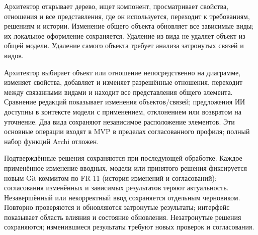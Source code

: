 \documentclass[10pt,a4paper]{article}
\begin{document}
Архитектор открывает дерево, ищет компонент, просматривает свойства, отношения и все представления, где он используется, переходит к требованиям, решениям и истории. Изменение общего объекта обновляет все зависимые виды; их локальное оформление сохраняется. Удаление из вида не удаляет объект из общей модели. Удаление самого объекта требует анализа затронутых связей и видов.

Архитектор выбирает объект или отношение непосредственно на диаграмме, изменяет свойства, добавляет и изменяет разрешённые отношения, переходит между связанными видами и находит все представления общего элемента. Сравнение редакций показывает изменения объектов/связей; предложения ИИ доступны в контексте модели с применением, отклонением или возвратом на уточнение. Два вида сохраняют независимое расположение элементов. Эти основные операции входят в MVP в пределах согласованного профиля; полный набор функций Archi отложен.

Подтверждённые решения сохраняются при последующей обработке. Каждое применённое изменение вводных, модели или принятого решения фиксируется новым Git-коммитом по FR-11 (история изменений и согласований); согласования изменённых и зависимых результатов теряют актуальность. Незавершённый или некорректный ввод сохраняется отдельным черновиком. Повторно проверяются и обновляются затронутые результаты; интерфейс показывает область влияния и состояние обновления. Незатронутые решения сохраняются; изменившиеся результаты требуют новых проверок и согласования.

\end{document}
